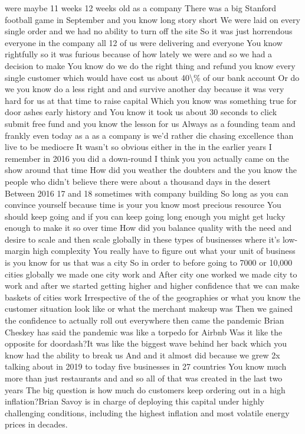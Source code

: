 \documentclass{article}%
\begin{document}
were maybe 11 weeks 12 weeks old as a company There was a big Stanford football game in September and you know long story short We were laid on every single order and we had no ability to turn off the site So it was just horrendous everyone in the company all 12 of us were delivering and everyone You know rightfully so it was furious because of how lately we were and so we had a decision to make You know do we do the right thing and refund you know every single customer which would have cost us about 40\textbackslash{}\% of our bank account Or do we you know do a less right and and survive another day because it was very hard for us at that time to raise capital Which you know was something true for door ashes early history and You know it took us about 30 seconds to click submit free fund and you know the lesson for us Always as a founding team and frankly even today as a as a company is we'd rather die chasing excellence than live to be mediocre It wasn't so obvious either in the in the earlier years I remember in 2016 you did a down{-}round I think you you actually came on the show around that time How did you weather the doubters and the you know the people who didn't believe there were about a thousand days in the desert Between 2016 17 and 18 sometimes with company building So long as you can convince yourself because time is your you know most precious resource You should keep going and if you can keep going long enough you might get lucky enough to make it so over time How did you balance quality with the need and desire to scale and then scale globally in these types of businesses where it's low{-}margin high complexity You really have to figure out what your unit of business is you know for us that was a city So in order to before going to 7000 or 10,000 cities globally we made one city work and After city one worked we made city to work and after we started getting higher and higher confidence that we can make baskets of cities work Irrespective of the of the geographies or what you know the customer situation look like or what the merchant makeup was Then we gained the confidence to actually roll out everywhere then came the pandemic Brian Cheskey has said the pandemic was like a torpedo for Airbnb Was it like the opposite for doordash?It was like the biggest wave behind her back which you know had the ability to break us And and it almost did because we grew 2x talking about in 2019 to today five businesses in 27 countries You know much more than just restaurants and and so all of that was created in the last two years The big question is how much do customers keep ordering out in a high inflation?Brian Savoy is in charge of deploying this capital under highly challenging conditions, including the highest inflation and most volatile energy prices in decades.%
\end{document}
